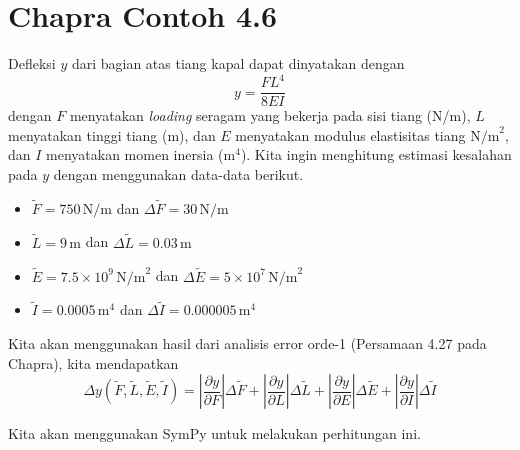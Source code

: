 \section{Chapra Contoh 4.6}

Defleksi $y$ dari bagian atas tiang kapal dapat dinyatakan
dengan
\begin{equation}
y = \frac{FL^{4}}{8EI}
\end{equation}
dengan $F$ menyatakan \textit{loading} seragam yang bekerja pada sisi
tiang (N/m), $L$ menyatakan tinggi tiang (m), dan $E$ menyatakan
modulus elastisitas tiang $\textrm{N/m}^{2}$, dan $I$ menyatakan
momen inersia ($\textrm{m}^{4}$). Kita ingin menghitung estimasi kesalahan
pada $y$ dengan menggunakan data-data berikut.
\begin{itemize}
\item $\tilde{F} = 750\,\textrm{N/m}$ dan $\Delta\tilde{F} = 30\,\textrm{N/m}$
\item $\tilde{L} = 9\,\textrm{m}$ dan $\Delta\tilde{L} = 0.03\,\textrm{m}$
\item $\tilde{E} = 7.5\times10^{9}\,\textrm{N/m}^{2}$ dan $\Delta\tilde{E} = 5\times10^{7}\,\textrm{N/m}^{2}$
\item $\tilde{I} = 0.0005\,\textrm{m}^{4}$ dan $\Delta\tilde{I} = 0.000005\,\textrm{m}^{4}$
\end{itemize}

Kita akan menggunakan hasil dari analisis error orde-1 (Persamaan 4.27 pada Chapra), kita
mendapatkan
\begin{equation*}
\Delta y(\tilde{F},\tilde{L},\tilde{E},\tilde{I}) =
\left| \frac{\partial y}{\partial F} \right| \Delta\tilde{F} +
\left| \frac{\partial y}{\partial L} \right| \Delta\tilde{L} +
\left| \frac{\partial y}{\partial E} \right| \Delta\tilde{E} +
\left| \frac{\partial y}{\partial I} \right| \Delta\tilde{I}
\end{equation*}

Kita akan menggunakan SymPy untuk melakukan perhitungan ini.

